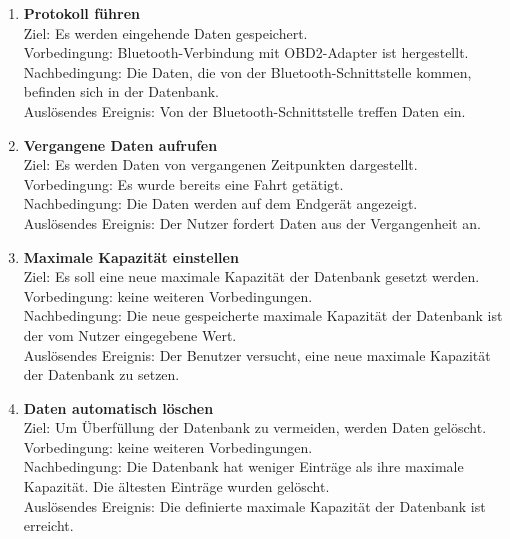 \documentclass[pflichtenheft.tex]{subfiles}
\begin{document}
	\begin{enumerate}
		\setcounter{enumi}{\value{enumTemp}}
		\item{\textbf{Protokoll führen}} \\ Ziel: Es werden eingehende Daten gespeichert.\\
		Vorbedingung: Bluetooth-Verbindung mit OBD2-Adapter ist hergestellt. \\
		Nachbedingung: Die Daten, die von der Bluetooth-Schnittstelle kommen, befinden sich in der Datenbank. \\ 
		Auslösendes Ereignis: Von der Bluetooth-Schnittstelle treffen Daten ein.
		
		\item{\textbf{Vergangene Daten aufrufen}} \label{pastData} \\ Ziel: Es werden Daten von vergangenen Zeitpunkten dargestellt. \\ Vorbedingung: Es wurde bereits eine Fahrt getätigt.\\
		Nachbedingung: Die Daten werden auf dem Endgerät angezeigt. \\
		Auslösendes Ereignis: Der Nutzer fordert Daten aus der Vergangenheit an.\\
		\item{\textbf{Maximale Kapazität einstellen}}\\
		Ziel: Es soll eine neue maximale Kapazität der Datenbank gesetzt werden. \\ Vorbedingung: keine weiteren Vorbedingungen.\\
		Nachbedingung: Die neue gespeicherte maximale Kapazität der Datenbank ist der vom Nutzer eingegebene Wert.\\
		Auslösendes Ereignis: Der Benutzer versucht, eine neue maximale Kapazität der Datenbank zu setzen. 
		
		\item{\textbf{Daten automatisch löschen}} \label{deleteData} \\ Ziel: Um Überfüllung der Datenbank zu vermeiden, werden Daten gelöscht. \\ Vorbedingung: keine weiteren Vorbedingungen.\\ Nachbedingung: Die Datenbank hat weniger Einträge als ihre maximale Kapazität. Die ältesten Einträge wurden gelöscht.\\
		Auslösendes Ereignis: Die definierte maximale Kapazität der Datenbank ist erreicht. 

		\renewcommand{\theenumi}{/FA\ifnum \value{enumi}<10 0\fi\arabic{enumi}0W/}
		\renewcommand{\labelenumi}{\theenumi}
		\renewcommand{\theenumii}{\arabic{enumii}}
		\renewcommand{\labelenumii}{/FA\ifnum \value{enumi}<10 0\fi\arabic{enumi}\arabic{enumii}W/}


\end{enumerate}
\end{document}
